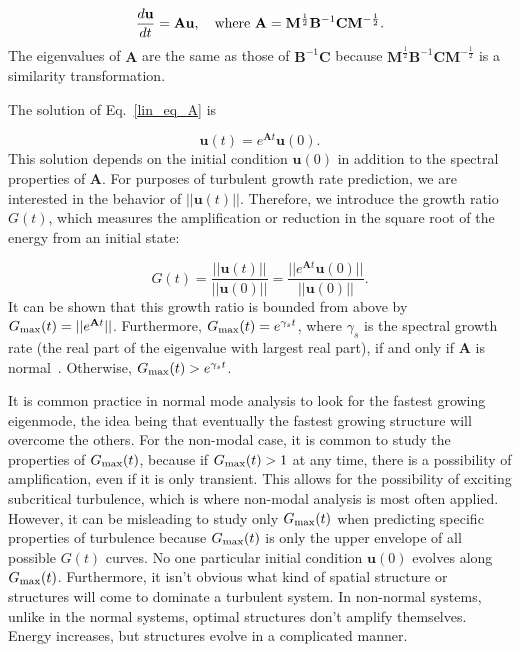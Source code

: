 \documentclass[showpacs,preprintnumbers,amsmath,amssymb,superscriptaddress,aip]{revtex4-1}
\def\beq{\begin{equation}}
\def\eeq{\end{equation}}
\newcommand{\diff}[2]{\frac{d#1}{d#2}}
\begin{document}
\beq
\label{lin_eq_A}
\diff{\mathbf{u}}{t} = \mathbf{A} \mathbf{u},  \quad \rm{where} \ \mathbf{A} = \mathbf{M}^{\frac{1}{2}} \mathbf{B}^{-1} \mathbf{C} \mathbf{M}^{-\frac{1}{2}}.
\eeq
The eigenvalues of $\mathbf{A}$ are the same as those of $\mathbf{B}^{-1} \mathbf{C}$ because $\mathbf{M}^{\frac{1}{2}} \mathbf{B}^{-1} \mathbf{C} \mathbf{M}^{-\frac{1}{2}}$ is a similarity transformation.

The solution of Eq.~\ref{lin_eq_A} is

\beq
\label{lin_soln}
\mathbf{u}(t) = e^{\mathbf{A} t} \mathbf{u}(0).
\eeq
This solution depends on the initial condition $\mathbf{u}(0)$ in addition to the spectral properties of $\mathbf{A}$. For purposes of turbulent growth rate prediction, we are interested in
the behavior of $||\mathbf{u}(t)||$. Therefore, we introduce the growth ratio $G(t)$, which measures the amplification or reduction in the square root of the energy from an initial state:

\beq
\label{g_def}
G(t) = \frac{||\mathbf{u}(t)||}{||\mathbf{u}(0)||} = \frac{||e^{\mathbf{A} t} \mathbf{u}(0)||}{||\mathbf{u}(0)||}.
\eeq
It can be shown that this growth ratio is bounded from above by $G_{\rm{max}}(t) = ||e^{\mathbf{A} t}||$. Furthermore, $G_{\rm{max}}(t) = e^{\gamma_s t}$, where $\gamma_s$ is the spectral growth rate
(the real part of the eigenvalue with largest real part), if and only if $\mathbf{A}$ is normal~\cite{schmid2007}. Otherwise, $G_{\rm{max}}(t) > e^{\gamma_s t}$. 

It is common practice in normal mode analysis to look for the fastest growing eigenmode, the idea being that eventually the fastest growing structure will overcome the others.
For the non-modal case, it is common to study the properties of $G_{\rm{max}}(t)$, because if $G_{\rm{max}}(t) > 1$ at any time, there is a possibility of amplification, even if it is only transient.
This allows for the possibility of exciting subcritical turbulence, which is where non-modal analysis is most often applied. 
However, it can be misleading to study only $G_{\rm{max}}(t)$ when predicting specific properties of turbulence because
$G_{\rm{max}}(t)$ is only the upper envelope of all possible $G(t)$ curves. No one particular initial condition $\mathbf{u}(0)$ evolves along $G_{\rm{max}}(t)$. 
Furthermore, it isn't obvious what kind of spatial structure or structures will come to dominate a turbulent system. 
In non-normal systems, unlike in the normal systems, optimal structures don't amplify themselves. Energy increases, but structures evolve in a complicated manner.
\end{document}
